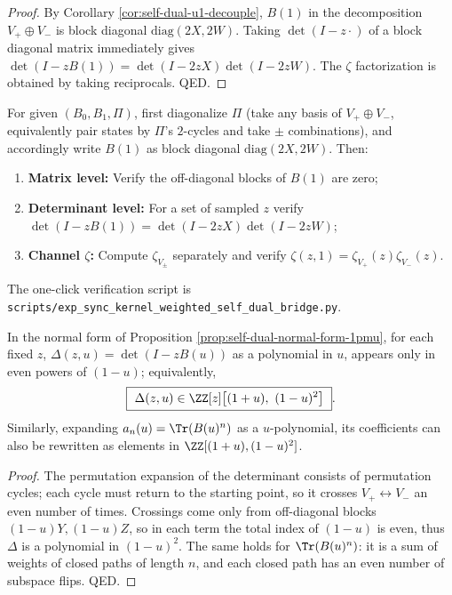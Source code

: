 \begin{proof}
By Corollary \ref{cor:self-dual-u1-decouple}, \(B(1)\) in the decomposition \(V_+\oplus V_-\) is block diagonal \(\mathrm{diag}(2X,2W)\).
Taking \(\det(I-z\cdot)\) of a block diagonal matrix immediately gives
\(
\det(I-zB(1))=\det(I-2zX)\det(I-2zW)
\).
The \(\zeta\) factorization is obtained by taking reciprocals. QED.
\end{proof}

\begin{remark}\label{rem:sync-kernel-u1-two-channel-bridge}
For given \((B_0,B_1,\Pi)\), first diagonalize \(\Pi\) (take any basis of \(V_+\oplus V_-\), equivalently pair states by \(\Pi\)'s \(2\)-cycles and take \(\pm\) combinations), and accordingly write \(B(1)\) as block diagonal \(\mathrm{diag}(2X,2W)\).
Then:
\begin{enumerate}
  \item \textbf{Matrix level:} Verify the off-diagonal blocks of \(B(1)\) are zero;
  \item \textbf{Determinant level:} For a set of sampled \(z\) verify \(\det(I-zB(1))=\det(I-2zX)\det(I-2zW)\);
  \item \textbf{Channel \(\zeta\):} Compute \(\zeta_{V_\pm}\) separately and verify \(\zeta(z,1)=\zeta_{V_+}(z)\zeta_{V_-}(z)\).
\end{enumerate}
The one-click verification script is \texttt{scripts/exp\_sync\_kernel\_weighted\_self\_dual\_bridge.py}.
\end{remark}

\begin{corollary}\label{cor:self-dual-delta-even-in-1mu}
In the normal form of Proposition \ref{prop:self-dual-normal-form-1pmu}, for each fixed \(z\),
\(\Delta(z,u)=\det(I-zB(u))\)
as a polynomial in \(u\), appears only in even powers of \((1-u)\); equivalently,
\[
\boxed{\ \Delta(z,u)\in \ZZ[z]\bigl[(1+u),\ (1-u)^2\bigr]\ }.
\]
Similarly, expanding \(a_n(u)=\Tr(B(u)^n)\) as a \(u\)-polynomial, its coefficients can also be rewritten as elements in \(\ZZ[(1+u),(1-u)^2]\).
\end{corollary}
\begin{proof}
The permutation expansion of the determinant consists of permutation cycles; each cycle must return to the starting point, so it crosses \(V_+\leftrightarrow V_-\) an even number of times.
Crossings come only from off-diagonal blocks \((1-u)Y,(1-u)Z\), so in each term the total index of \((1-u)\) is even, thus \(\Delta\) is a polynomial in \((1-u)^2\).
The same holds for \(\Tr(B(u)^n)\): it is a sum of weights of closed paths of length \(n\), and each closed path has an even number of subspace flips.
QED.
\end{proof}

